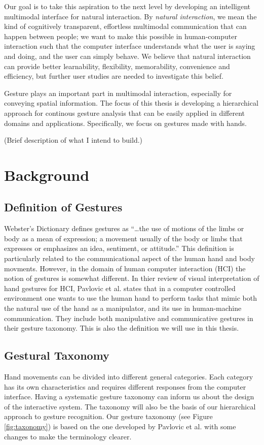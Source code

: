 Our goal is to take this aspiration to the next level by developing an
intelligent multimodal interface for natural interaction. By \textit{natural
interaction}, we mean the kind of cognitively transparent, effortless multimodal
communication that can happen between people; we want to make this possible in
human-computer interaction such that the computer interface understands what the
user is saying and doing, and the user can simply behave. We believe that
natural interaction can provide better learnability, flexibility, memorability,
convenience and efficiency, but further user studies are needed to investigate
this belief.

Gesture plays an important part in multimodal interaction, especially for
conveying spatial information. The focus of this thesis is developing a
hierarchical approach for continous gesture analysis that can be easily
applied in different domains and applications. Specifically, we focus on
gestures made with hands.

(Brief description of what I intend to build.)

\section{Background}
\subsection{Definition of Gestures}
Webster's Dictionary defines gestures as ``\ldots the use of motions of the
limbs or body as a mean of expression; a movement usually of the body or limbs
that expresses or emphasizes an idea, sentiment, or attitude.'' This definition
is particularly related to the communicational aspect of the human hand and body
movments. However, in the domain of human computer interaction (HCI) the notion
of gestures is somewhat different. In thier review of visual interpretation of hand
gestures for HCI, Pavlovic et al. \cite{Pavlovic97} states that in a computer
controlled environment one wants to use the human hand to perform tasks that
mimic both the natural use of the hand as a manipulator, and its use in
human-machine communication. They include both manipulative and communicative
gestures in their gesture taxonomy. This is also the definition we will use in
this thesis.

\subsection{Gestural Taxonomy}\label{sec:taxonomy}
Hand movements can be divided into different general categories. Each
category has its own characteristics and requires different responses from
the computer interface. Having a systematic gesture taxonomy can inform
us about the design of the interactive system. The taxonomy will also be the
basis of our hierarchical approach to gesture recognition. Our gesture taxonomy (see
Figure \ref{fig:taxonomy}) is based on the one developed by Pavlovic et al.
\cite{Pavlovic97} with some changes to make the terminology clearer.

